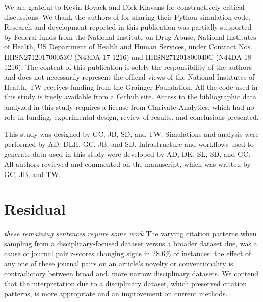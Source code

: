 \documentclass[NETN]{stjour}
\begin{document}



\acknowledgments
We are grateful to Kevin Boyack and Dick Klavans for constructively critical discussions. We thank the authors of \cite{uzzi_atypical_2013} for sharing their Python simulation code. Research and development reported in this publication was partially supported by Federal funds from the National Institute on Drug Abuse, National Institutes of Health, US Department of Health and Human Services, under Contract Nos. HHSN271201700053C (N43DA-17-1216) and HHSN271201800040C (N44DA-18-1216). The content of this publication is solely the responsibility of the authors and does not necessarily represent the official views of the National Institutes of Health. TW receives funding from the Grainger Foundation. 
All the code used in this study is freely available from a Github site. Access to the bibliographic data analyzed in this study requires a license from Clarivate Analytics, which had no role in funding, experimental design, review of results, and conclusions presented. 

\authorcontributions 
This study was designed by GC, JB, SD, and TW. Simulations and analysis were performed by AD, DLH, GC, JB, and SD. Infrastructure and workflows used to generate data used in this study were developed by AD, DK, SL, SD, and GC.  All authors reviewed and commented on the manuscript, which was written by GC, JB, and TW.




\newpage
\section{Residual}
\emph{these remaining sentences require some work}
The varying citation patterns when sampling from a disciplinary-focused dataset versus a broader dataset due, was a cause of journal pair z-scores changing signs in 28.6\% of instances: the effect of any one of these journal pairs on an article's novelty or conventionality is contradictory between broad and, more narrow disciplinary datasets. We contend that the interpretation due to a disciplinary dataset, which preserved citation patterns, is more appropriate and an improvement on current methods. 
\end{document}
